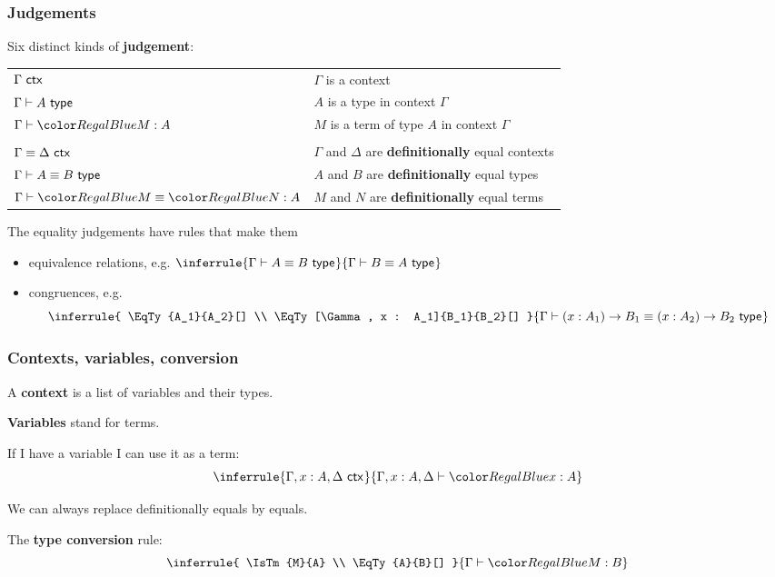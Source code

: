 \documentclass[handout]{beamer} %
\begin{document}
\begin{frame}
  \frametitle{Judgements}
  
  Six distinct kinds of \textbf{judgement}:
  \begin{center}
    \begin{tabular}{ll}
      $\Gamma\ \mathsf{ctx}_{}$    & $\Gamma$ is a context \\
      $\IsTy{A}[]$        & $A$ is a type in context $\Gamma$ \\
      $\IsTm{M}{A}$       & $M$ is a term of type $A$ in context $\Gamma$ \\
      & \\
      $\Gamma \equiv \Delta\ \mathsf{ctx}_{}$  & $\Gamma$ and $\Delta$ are \textbf{definitionally} equal contexts \\
      $\EqTy{A}{B}[]$             & $A$ and $B$ are \textbf{definitionally} equal types \\
      $\EqTm{M}{N}{A}$          & $M$ and $N$ are \textbf{definitionally} equal terms
    \end{tabular}
  \end{center}
  The equality judgements have rules that make them
  \begin{itemize}
    \item equivalence relations, e.g. $
        \inferrule{
          \EqTy{A}{B}[]
        }{
          \EqTy{B}{A}[]
        }
    $
    \item congruences, e.g. \[
      \inferrule{
        \EqTy{A_1}{A_2}[] \\
        \EqTy[\Gamma, x : A_1]{B_1}{B_2}[]
      }{
        \EqTy{\Fn{x}{A_1}{B_1}}{\Fn{x}{A_2}{B_2}}[]
      }
    \]
  \end{itemize}
\end{frame}

\begin{frame}
  \frametitle{Contexts, variables, conversion}
  A \textbf{context} is a list of variables and their types.
  
  \medskip

  \textbf{Variables} stand for terms.

  If I have a variable I can use it as a term:
  \[
    \inferrule{
      \IsCtx{\Gamma, x : A, \Delta}
    }{
      \IsTm[\Gamma, x : A, \Delta]{x}{A}
    }
  \]
  
  \medskip
  
  We can always replace definitionally equals by equals. 

  The \textbf{type conversion} rule:
  \[
    \inferrule{
      \IsTm{M}{A} \\
      \EqTy{A}{B}[]
    }{
      \IsTm{M}{B}
    }
  \]

\end{frame}
\end{document}
